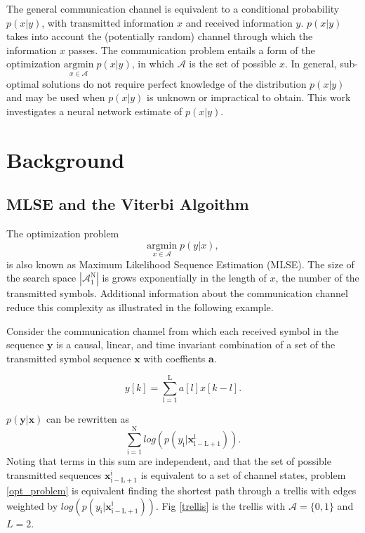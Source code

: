 \documentclass[12pt,a4paper]{article}
\begin{document}
The general communication channel is equivalent to a conditional probability $p(x|y)$, with transmitted information $x$ and received information $y$.  $p(x|y)$ takes into account the (potentially random) channel through which the information $x$ passes. The communication problem entails a form of the optimization $\underset{x\in\mathcal{A}}{\text{argmin}} \; p(x|y)$, in which $\mathcal{A}$ is the set of possible $x$. In general, sub-optimal solutions do not require perfect knowledge of the distribution $p(x|y)$ and may be used when $p(x|y)$ is unknown or impractical to obtain. This work investigates a neural network estimate of $p(x|y)$.

\section{Background}

\subsection{MLSE and the Viterbi Algoithm}
The optimization problem
\begin{equation}\label{opt_problem}
\underset{x \in \textit{$\mathcal{A}$}}{\text{argmin}} \; p(y|x),
\end{equation}
 is also known as Maximum Likelihood Sequence Estimation (MLSE). 
The size of the search space $|\mathcal{A}_{\mathrm{1}}^{\mathrm{N}}|$ is grows exponentially in the length of $x$, the number of the transmitted symbols. Additional information about the communication channel reduce this complexity as illustrated in the following example.
\par
Consider the communication channel from which each received symbol in the sequence $\mathbf{y}$ is a causal, linear, and time invariant combination of a set of the transmitted symbol sequence $\mathbf{x}$ with coeffients $\mathbf{a}$. 

\begin{equation}
y[k] = \sum_{\mathrm{l=1}}^{\mathrm{L}} a[l]x[k-l].
\end{equation}

$p(\mathbf{y}|\mathbf{x})$ can be rewritten as 
\begin{equation}
\sum_{\mathrm{i=1}}^{\mathrm{N}}log(p(y_{\mathrm{i}}|\mathbf{x}_{\mathrm{i-L+1}}^{\mathrm{i}}) ).
\end{equation}
Noting that terms in this sum are independent, and that the set of possible transmitted sequences $\mathbf{x}_{\mathrm{i-L+1}}^{\mathrm{i}}$ is equivalent to a set of channel states, problem \eqref{opt_problem} is equivalent finding the shortest path through a trellis  with edges weighted by $log(p(y_{\mathrm{i}}|\mathbf{x}_{\mathrm{i-L+1}}^{\mathrm{i}}))$. Fig \ref{trellis} is the trellis with $\mathcal{A}=\{0,1\}$ and $L=2$.
\end{document}
